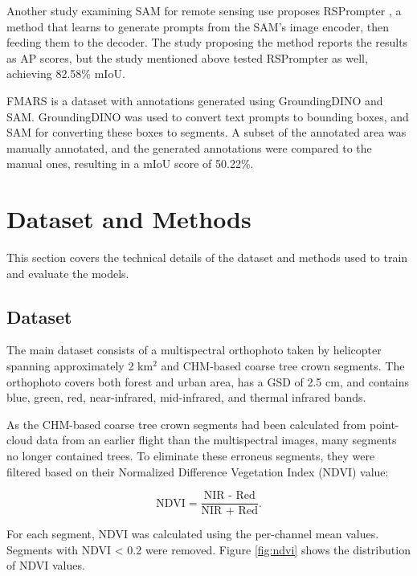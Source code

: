 \documentclass[english, 12pt, a4paper, sci, utf8, a-2b, online]{aaltothesis}
\begin{document}
\begin{enumerate}
\begin{end}
Another study examining SAM for remote sensing use proposes RSPrompter \cite{rsprompter}, a method that learns to generate prompts from the SAM's image encoder, then feeding them to the decoder. The study proposing the method reports the results as AP scores, but the study mentioned above tested RSPrompter as well, achieving 82.58\% mIoU. \cite{sam-treecrown}

FMARS \cite{fmars} is a dataset with annotations generated using GroundingDINO and SAM. GroundingDINO was used to convert text prompts to bounding boxes, and SAM for converting these boxes to segments. A subset of the annotated area was manually annotated, and the generated annotations were compared to the manual ones, resulting in a mIoU score of 50.22\%.

\newpage
\section{Dataset and Methods}

This section covers the technical details of the dataset and methods used to train and evaluate the models.

\subsection{Dataset}

The main dataset consists of a multispectral orthophoto taken by helicopter spanning approximately 2 km$^2$ and CHM-based coarse tree crown segments. The orthophoto covers both forest and urban area, has a GSD of 2.5 cm, and contains blue, green, red, near-infrared, mid-infrared, and thermal infrared bands.

As the CHM-based coarse tree crown segments had been calculated from point-cloud data from an earlier flight than the multispectral images, many segments no longer contained trees. To eliminate these erroneus segments, they were filtered based on their Normalized Difference Vegetation Index (NDVI) value:

$$
\text{NDVI} = \frac{\text{NIR - Red}}{\text{NIR + Red}}.
$$

For each segment, NDVI was calculated using the per-channel mean values. Segments with NDVI < 0.2 were removed. Figure \ref{fig:ndvi} shows the distribution of NDVI values.


\end{end}
\end{enumerate}
\end{document}
